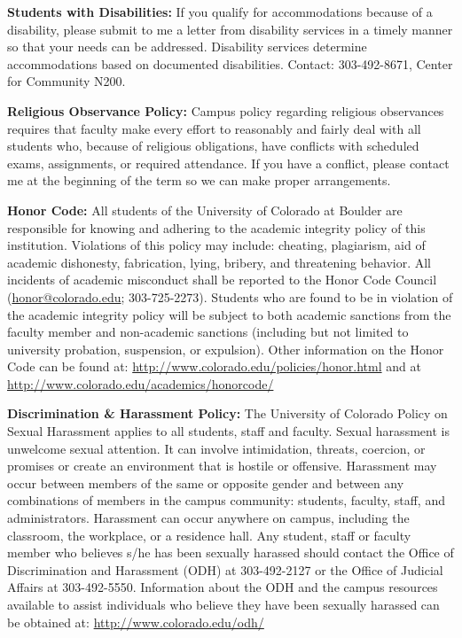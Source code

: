 \documentclass[12pt]{article}
\begin{document}
\footnotesize{
	\vspace{5mm}\noindent 
	\textbf{Students with Disabilities:} 
	If you qualify for accommodations because of a disability, please submit to me a letter from disability services in a timely manner so that your needs can be addressed. Disability services determine accommodations based on documented disabilities.
	Contact: 303-492-8671, Center for Community N200.
	
	\vspace{5mm}\noindent
	\textbf{Religious Observance Policy:}
	Campus policy regarding religious observances requires that faculty make every effort to reasonably and fairly deal with all students who, because of religious obligations, have conflicts with scheduled exams, assignments, or required attendance. If you have a conflict, please contact me at the beginning of the term so we can make proper arrangements. 
	
	\vspace{5mm}\noindent
	\textbf{Honor Code:}
	All students of the University of Colorado at Boulder are responsible for knowing and adhering to the academic integrity policy of this institution. Violations of this policy may include: cheating, plagiarism, aid of academic dishonesty, fabrication, lying, bribery, and threatening behavior. All incidents of academic misconduct shall be reported to the Honor Code Council (\href{mailto:honor@colorado.edu}{honor@colorado.edu}; 303-725-2273).
	Students who are found to be in violation of the academic integrity policy will be subject to both academic sanctions from the faculty member and non-academic sanctions (including but not limited to university probation, suspension, or expulsion). Other information on the Honor Code can be found at: \url{http://www.colorado.edu/policies/honor.html} and at \url{http://www.colorado.edu/academics/honorcode/}
	
	\vspace{5mm}\noindent
	\textbf{Discrimination \& Harassment Policy:}
	The University of Colorado Policy on Sexual Harassment applies to all students, staff and faculty. Sexual harassment is unwelcome sexual attention. It can involve intimidation, threats, coercion, or promises or create an environment that is hostile or offensive. Harassment may occur between members of the same or opposite gender and between any combinations of members in the campus community: students, faculty, staff, and administrators. Harassment can occur anywhere on campus, including the classroom, the workplace, or a residence hall. Any student, staff or faculty member who believes s/he has been sexually harassed should contact the Office of Discrimination and Harassment (ODH) at 303-492-2127 or the Office of Judicial Affairs at 303-492-5550. Information about the ODH and the campus resources available to assist individuals who believe they have been sexually harassed can be obtained at: \url{http://www.colorado.edu/odh/}

}
\end{document}
